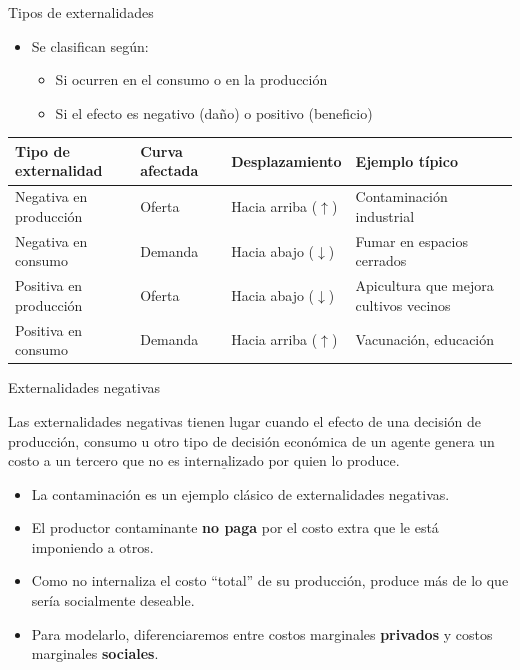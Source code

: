 \documentclass{beamer}
\begin{document}
\begin{frame}{Tipos de externalidades}
    \small
    \begin{itemize}
        \item Se clasifican según:
        \begin{itemize}
            \item Si ocurren en el consumo o en la producción
            \item Si el efecto es negativo (daño) o positivo (beneficio)
        \end{itemize}
    \end{itemize}

    \vspace{0.3cm}
    \begin{table}[]
    \centering
    \scriptsize
    \begin{tabular}{|p{2.5cm}|p{2cm}|p{2.5cm}|p{3cm}|}
        \hline
        \textbf{Tipo de externalidad} & \textbf{Curva afectada} & \textbf{Desplazamiento} & \textbf{Ejemplo típico} \\
        \hline
        Negativa en producción  & Oferta  & Hacia arriba (\( \uparrow \)) & Contaminación industrial \\
        \hline
        Negativa en consumo     & Demanda & Hacia abajo (\( \downarrow \)) & Fumar en espacios cerrados \\
        \hline
        Positiva en producción  & Oferta  & Hacia abajo (\( \downarrow \)) & Apicultura que mejora cultivos vecinos \\
        \hline
        Positiva en consumo     & Demanda & Hacia arriba (\( \uparrow \)) & Vacunación, educación \\
        \hline
    \end{tabular}
    \end{table}
\end{frame}


\begin{frame}{Externalidades negativas}
    \begin{boxA}
        \centering
        Las externalidades negativas tienen lugar cuando el efecto de
        una decisión de producción, consumo u otro tipo de decisión
        económica de un agente genera un costo a un tercero que no es
        $\underline{\text{internalizado}}$ por quien lo produce.
    \end{boxA}
    \begin{itemize}
        \item La contaminación es un ejemplo clásico de externalidades negativas.
        \item El productor contaminante \textbf{no paga} por el costo extra que le está imponiendo a otros.
        \item Como no internaliza el costo ``total'' de su producción, produce más de lo que sería socialmente deseable.
        \item Para modelarlo, diferenciaremos entre costos marginales \textbf{privados} y costos marginales \textbf{sociales}.
    \end{itemize}
\end{frame}
\end{document}
